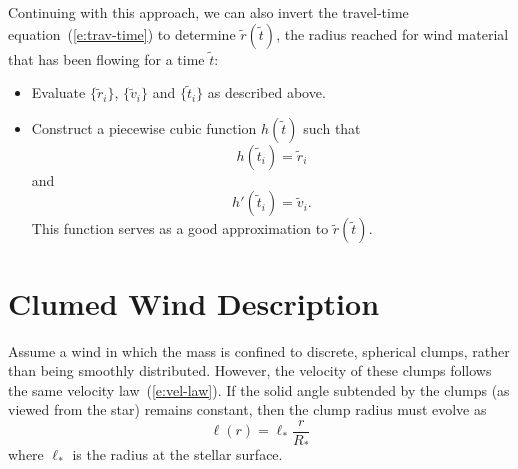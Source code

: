 \documentclass{article}
\newcommand{\Rstar}{R_{\ast}}
\newcommand{\tr}{\tilde{r}}
\newcommand{\tv}{\tilde{v}}
\newcommand{\tti}{\tilde{t}}
\newcommand{\ellstar}{\ell_{\ast}}
\begin{document}
Continuing with this approach, we can also invert the travel-time
equation~(\ref{e:trav-time}) to determine $\tr(\tti)$, the radius
reached for wind material that has been flowing for a time $\tti$:
%
\begin{itemize}
\item Evaluate $\{\tr_{i}\}$, $\{\tv_{i}\}$ and $\{\tti_{i}\}$ as
  described above.
\item Construct a piecewise cubic function $h(\tti)$ such that
  \[
  h(\tti_{i}) = \tr_{i}
  \]
  and
  \[
  h'(\tti_{i}) = \tv_{i}.
  \]
  This function serves as a good approximation to $\tr(\tti)$.
\end{itemize}
%

\section*{Clumed Wind Description}

Assume a wind in which the mass is confined to discrete, spherical
clumps, rather than being smoothly distributed. However, the velocity
of these clumps follows the same velocity law~(\ref{e:vel-law}). If
the solid angle subtended by the clumps (as viewed from the star)
remains constant, then the clump radius must evolve as
%
\begin{equation}
  \ell(r) = \ellstar \frac{r}{\Rstar}
\end{equation}
%
where $\ellstar$ is the radius at the stellar surface.
\end{document}
